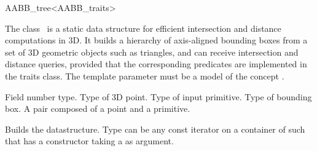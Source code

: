 \ccRefPageBegin


\begin{ccRefClass}{AABB_tree<AABB_traits>}


\ccDefinition
  
The class \ccRefName\ is a static data structure for efficient intersection and distance computations in 3D. It builds a hierarchy of axis-aligned bounding boxes from a set of 3D geometric objects such as triangles, and can receive intersection and distance queries, provided that the corresponding predicates are implemented in the traits class. The template parameter must be a model of the concept .


\ccTypes

          {Field number type.}
\ccGlue
{}
          {Type of 3D point.}
\ccGlue
{}
          {Type of input primitive.}
\ccGlue
{}
          {Type of bounding box.}
\ccGlue
{}
          {A pair composed of a point and a primitive.}


\ccCreation
{} %

{Builds the datastructure. Type  can be any const iterator on a container of  such that  has a constructor taking a  as argument.}


\end{ccRefClass}
